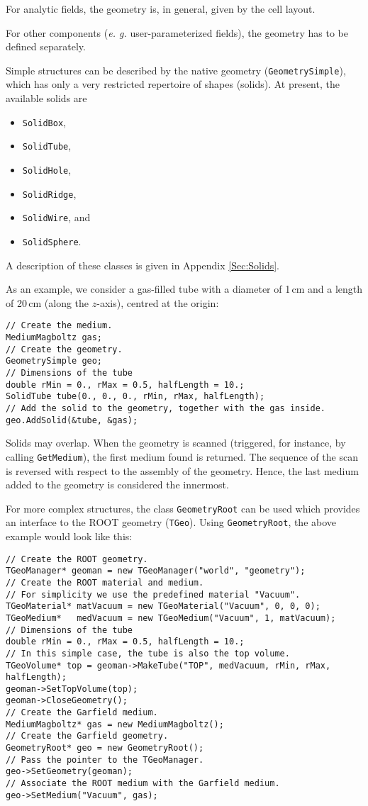 For analytic fields, the geometry is, in general, given by the 
cell layout.

For other components (\textit{e. g.} user-parameterized fields), 
the geometry has to be defined separately. 

Simple structures can be described by the native geometry (\texttt{GeometrySimple}), which has only a very restricted repertoire of shapes (solids). 
At present, the available solids are
\begin{itemize}
  \item
  \texttt{SolidBox}, 
  \item
  \texttt{SolidTube}, 
  \item
  \texttt{SolidHole}, 
  \item
  \texttt{SolidRidge}, 
  \item
  \texttt{SolidWire}, and
  \item
  \texttt{SolidSphere}.
\end{itemize} 
A description of these classes is given in Appendix \ref{Sec:Solids}.

As an example, we consider a gas-filled tube with a diameter of 1\,cm and 
a length of 20\,cm (along the \(z\)-axis), centred at the origin:
\begin{lstlisting}
// Create the medium.
MediumMagboltz gas;
// Create the geometry.
GeometrySimple geo;
// Dimensions of the tube
double rMin = 0., rMax = 0.5, halfLength = 10.;
SolidTube tube(0., 0., 0., rMin, rMax, halfLength);
// Add the solid to the geometry, together with the gas inside.
geo.AddSolid(&tube, &gas);
\end{lstlisting}

Solids may overlap. 
When the geometry is scanned 
(triggered, for instance, by calling \texttt{GetMedium}), the  
first medium found is returned. 
The sequence of the scan is reversed with respect to the 
assembly of the geometry. 
Hence, the last medium added to the geometry is considered the innermost. 

For more complex structures, the class \texttt{GeometryRoot} can be used 
which provides an interface to the ROOT geometry (\texttt{TGeo}).
Using \texttt{GeometryRoot}, the above example would look like this:
\begin{lstlisting}
// Create the ROOT geometry.
TGeoManager* geoman = new TGeoManager("world", "geometry");
// Create the ROOT material and medium. 
// For simplicity we use the predefined material "Vacuum".
TGeoMaterial* matVacuum = new TGeoMaterial("Vacuum", 0, 0, 0);
TGeoMedium*   medVacuum = new TGeoMedium("Vacuum", 1, matVacuum);
// Dimensions of the tube
double rMin = 0., rMax = 0.5, halfLength = 10.;
// In this simple case, the tube is also the top volume.
TGeoVolume* top = geoman->MakeTube("TOP", medVacuum, rMin, rMax, halfLength);
geoman->SetTopVolume(top);
geoman->CloseGeometry();
// Create the Garfield medium.
MediumMagboltz* gas = new MediumMagboltz();
// Create the Garfield geometry.
GeometryRoot* geo = new GeometryRoot();
// Pass the pointer to the TGeoManager.
geo->SetGeometry(geoman);
// Associate the ROOT medium with the Garfield medium.
geo->SetMedium("Vacuum", gas); 
\end{lstlisting} 

